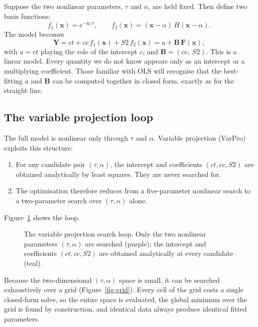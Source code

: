 \documentclass[11pt,a4paper]{article}
\begin{document}
Suppose the two nonlinear parameters, $\tau$ and $\alpha$, are held fixed.
Then define two basis functions:
\begin{equation}
f_1(\mathbf{x}) = e^{-\mathbf{x}/\tau}, \qquad
f_2(\mathbf{x}) = (\mathbf{x}-\alpha)\,H(\mathbf{x}-\alpha).
\end{equation}
The model becomes
\begin{equation}
\mathbf{Y} = ct + cc\,f_1(\mathbf{x}) + S2\,f_2(\mathbf{x})
           = a + \mathbf{B}\,\mathbf{F}(\mathbf{x}),
\end{equation}
with $a = ct$ playing the role of the intercept $c$, and
$\mathbf{B} = (cc,\ S2)$. This is a linear model. Every quantity we do not
know appears only as an intercept or a multiplying coefficient. Those
familiar with OLS will recognise that the best-fitting $a$ and
$\mathbf{B}$ can be computed together in closed form, exactly as for the
straight line.

\subsection{The variable projection loop}
The full model is nonlinear only through $\tau$ and $\alpha$. Variable
projection (VarPro) exploits this structure:
\begin{enumerate}[nosep]
\item For any candidate pair $(\tau, \alpha)$, the intercept and
  coefficients $(ct, cc, S2)$ are obtained analytically by least squares.
  They are never searched for.
\item The optimisation therefore reduces from a five-parameter nonlinear
  search to a two-parameter search over $(\tau, \alpha)$ alone.
\end{enumerate}
Figure~\ref{fig:loop} shows the loop.

\begin{figure}[ht]
\centering

\caption{The variable projection search loop. Only the two nonlinear
parameters $(\tau,\alpha)$ are searched (purple); the intercept and
coefficients $(ct, cc, S2)$ are obtained analytically at every candidate
(teal).}
\label{fig:loop}
\end{figure}

Because the two-dimensional $(\tau,\alpha)$ space is small, it can be
searched exhaustively over a grid (Figure~\ref{fig:grid}). Every cell of
the grid costs a single closed-form solve, so the entire space is
evaluated, the global minimum over the grid is found by construction, and
identical data always produce identical fitted parameters.
\end{document}
